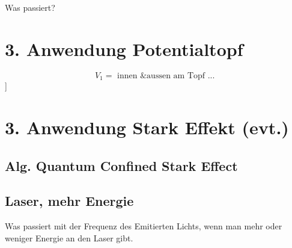 \begin{refsection}
Was passiert?

\section{ 3. Anwendung Potentialtopf }

\[
  V_1 = \text{ innen \& aussen am Topf ... }
\]
]

\section{ 3. Anwendung Stark Effekt (evt.) }

\subsection{ Alg. Quantum Confined Stark Effect }

\subsection{ Laser, mehr Energie }
Was passiert mit der Frequenz des Emitierten Lichts, wenn man mehr oder weniger Energie an den Laser gibt.

\printbibliography[heading=subbibliography]
\end{refsection}
